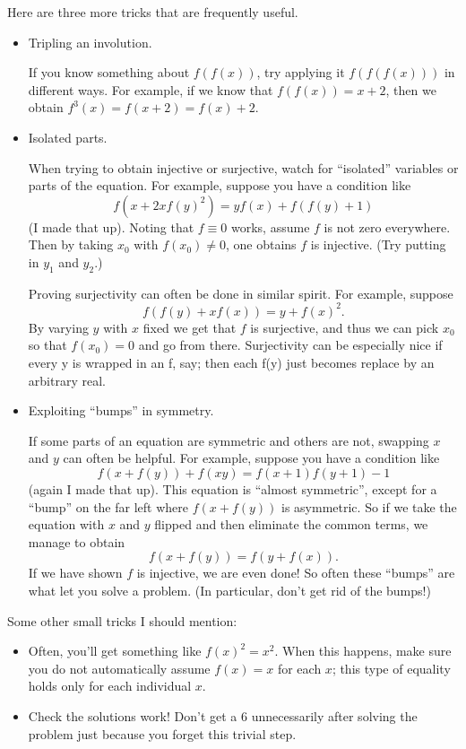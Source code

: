 Here are three more tricks that are frequently useful.
\begin{itemize}
\item Tripling an involution. 

If you know something about $f(f(x))$, try applying it $f(f(f(x)))$ in different ways. For example, if we know that $f(f(x))=x+2$, then we obtain $f^3(x)=f(x+2)=f(x)+2$.

\item Isolated parts.

When trying to obtain injective or surjective, watch for ``isolated'' variables or parts of the equation. For example, suppose you have a condition like
\[ f(x+2xf(y)^2)=yf(x)+f(f(y)+1) \]
(I made that up). Noting that $f\equiv0$ works, assume $f$ is not zero everywhere. Then by taking $x_0$ with $f(x_0)\neq0$, one obtains $f$ is injective. (Try putting in $y_1$ and $y_2$.)

Proving surjectivity can often be done in similar spirit. For example, suppose
\[ f(f(y)+xf(x))=y+f(x)^2. \]
By varying $y$ with $x$ fixed we get that $f$ is surjective, and thus we can pick $x_0$ so that $f(x_0)=0$ and go from there. Surjectivity can be especially nice if every y is
wrapped in an f, say; then each f(y) just becomes replace by an arbitrary real.

\item Exploiting ``bumps'' in symmetry.

If some parts of an equation are symmetric and others are not, swapping $x$ and $y$ can often be helpful. For example, suppose you have a condition like
\[ f(x+f(y))+f(xy)=f(x+1)f(y+1)-1 \]
(again I made that up). This equation is ``almost symmetric'', except for a ``bump'' on the far left where $f(x+f(y))$ is asymmetric. So if we take the equation with $x$ and $y$ flipped and then eliminate the common terms, we manage to obtain
\[ f(x+f(y))=f(y+f(x)). \]
If we have shown $f$ is injective, we are even done! So often these “bumps” are what let you solve a problem. (In particular, don’t get rid of the bumps!)
\end{itemize}

Some other small tricks I should mention:
\begin{itemize}
\item Often, you’ll get something like $f(x)^2=x^2$. When this happens, make sure you do not automatically assume $f(x)=x$ for each $x$; this type of equality holds only for each individual $x$.
\item Check the solutions work! Don’t get a 6 unnecessarily after solving the problem just because you forget this trivial step.
\end{itemize}

